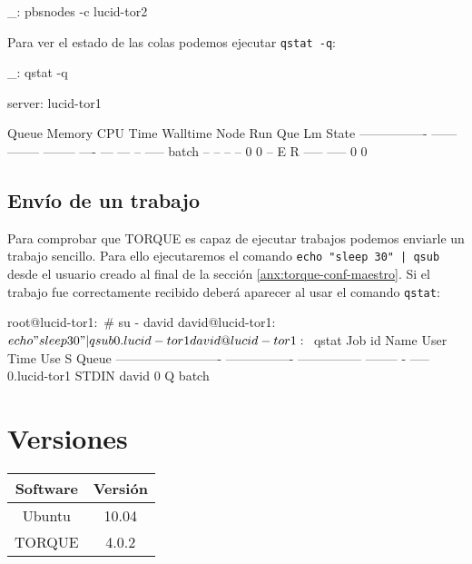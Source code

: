 \begin{bashcode}
_: pbsnodes -c lucid-tor2
\end{bashcode}

Para ver el estado de las colas podemos ejecutar \texttt{qstat -q}:

\begin{bashcode}
_: qstat -q

server: lucid-tor1

Queue            Memory CPU Time Walltime Node  Run Que Lm  State
---------------- ------ -------- -------- ----  --- --- --  -----
batch              --      --       --      --    0   0 --   E R
                                               ----- -----
                                                   0     0
\end{bashcode}


\subsection{Envío de un trabajo}

Para comprobar que TORQUE es capaz de ejecutar trabajos podemos enviarle un trabajo sencillo. Para ello ejecutaremos el comando \texttt{echo "sleep 30" | qsub} desde el usuario creado al final de la sección \ref{anx:torque-conf-maestro}. Si el trabajo fue correctamente recibido deberá aparecer al usar el comando \texttt{qstat}:

\begin{bashcode}
root@lucid-tor1:~# su - david
david@lucid-tor1:~$ echo "sleep 30" | qsub
0.lucid-tor1
david@lucid-tor1:~$ qstat
Job id                    Name             User            Time Use S Queue
------------------------- ---------------- --------------- -------- - -----
0.lucid-tor1              STDIN            david                  0 Q batch
\end{bashcode}


\section{Versiones}

\begin{tabular}{|c|c|}
   \hline
   Software & Versión \\ \hline
   Ubuntu & 10.04 \\ \hline
   TORQUE & 4.0.2 \\ \hline
\end{tabular}
